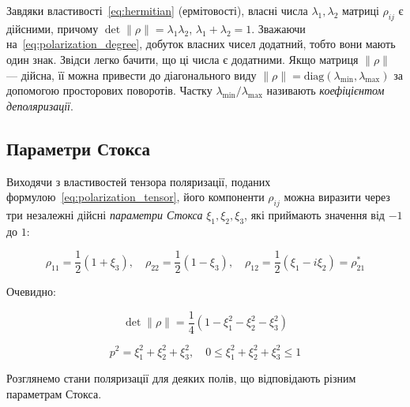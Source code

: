 Завдяки властивості~\eqref{eq:hermitian} (ермітовості), власні числа \(\lambda_1, \lambda_2\) матриці \(\rho_{ij}\) є дійсними, причому \(\det \|\rho\| = \lambda_1 \lambda_2\),
\(\lambda_1 + \lambda_2 = 1\). Зважаючи на~\eqref{eq:polarization_degree}, добуток власних чисел додатний, тобто вони мають один знак. Звідси легко
бачити, що ці числа є додатними. Якщо матриця $\|\rho \|$ --- дійсна, її можна привести до діагонального виду  $\| \rho \| = \mathrm{diag}(\lambda_{\min}, \lambda_{\max})$ за допомогою просторових поворотів. Частку \(\lambda_{\min}/\lambda_{\max}\) називають \emph{коефіцієнтом деполяризації}.

\subsection*{Параметри Стокса}

Виходячи з властивостей тензора поляризації, поданих формулою~\eqref{eq:polarization_tensor}, його компоненти \(\rho_{ij}\) можна виразити через три
незалежні дійсні \emph{параметри Стокса} \(\xi_1, \xi_2, \xi_3\), які приймають значення від $-1$ до $1$:

\begin{equation*}
\rho_{11} = \frac{1}{2} \left( 1 + \xi_3 \right), \quad \rho_{22} = \frac{1}{2} \left( 1 - \xi_3 \right), \quad \rho_{12} = \frac{1}{2} \left( \xi_1 -
i\xi_2 \right) = \rho_{21}^{*}
\end{equation*}

Очевидно:

\begin{equation*}
\det \|\rho\| = \frac{1}{4} \left( 1 - \xi_1^2 - \xi_2^2 - \xi_3^2 \right)
\end{equation*}

\begin{equation*}
p^2 = \xi_1^2 + \xi_2^2 + \xi_3^2, \quad 0 \leqslant \xi_1^2 + \xi_2^2 + \xi_3^2 \leqslant 1
\end{equation*}

Розглянемо стани поляризації для деяких полів, що відповідають різним параметрам Стокса.

